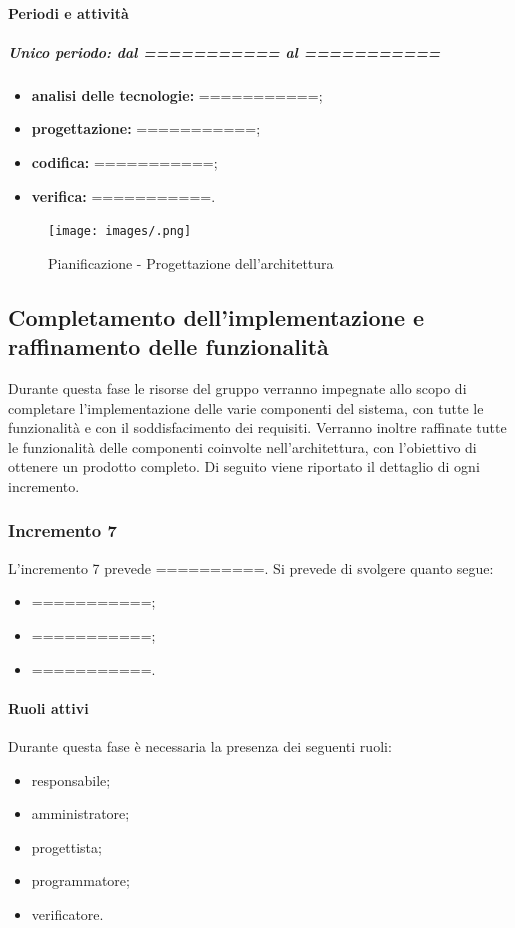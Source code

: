 \paragraph{Periodi e attività}
\subparagraph{Unico periodo: dal =========== al ===========}
\begin{itemize}
	\item \textbf{analisi delle tecnologie:} ===========;
	\item \textbf{progettazione:} ===========;
	\item \textbf{codifica:} ===========;
	\item \textbf{verifica:} ===========.
\end{itemize}

\newpage 

\begin{landscape} 
	\begin{figure}[h!] 
		\texttt{[image: images/.png]} 
		\caption{Pianificazione - Progettazione dell'architettura} 
	\end{figure} 
\end{landscape} 

\newpage %

\subsection{Completamento dell'implementazione e raffinamento delle funzionalità}
Durante questa fase le risorse del gruppo verranno impegnate allo scopo di completare l'implementazione delle varie componenti del sistema, con tutte le funzionalità e con il soddisfacimento dei requisiti. Verranno inoltre raffinate tutte le funzionalità delle componenti coinvolte nell'architettura, con l'obiettivo di ottenere un prodotto completo.
\newline
Di seguito viene riportato il dettaglio di ogni incremento.

\subsubsection{Incremento 7}
L'incremento 7 prevede ==========. Si prevede di svolgere quanto segue:
\begin{itemize}
	\item ===========;
	\item ===========;
	\item ===========.
\end{itemize}

\paragraph{Ruoli attivi}
Durante questa fase è necessaria la presenza dei seguenti ruoli: 
\begin{itemize} 
	\item responsabile; 
	\item amministratore; 
	\item progettista; 
	\item programmatore; 
	\item verificatore.
\end{itemize}


